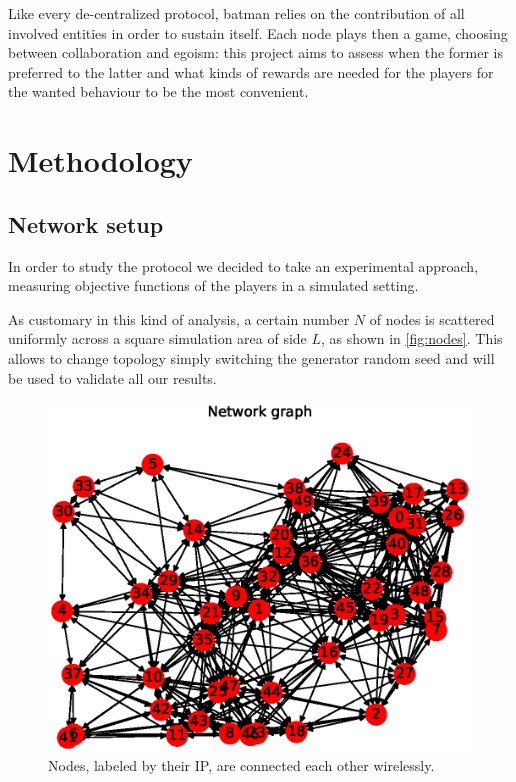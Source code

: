 \documentclass[conference]{IEEEtran}
\begin{document}
Like every de-centralized protocol, \gls{batman} relies on the contribution of all involved entities in order to sustain itself. Each node plays then a game, choosing between collaboration and egoism: this project aims to assess when the former is preferred to the latter and what kinds of rewards are needed for the players for the wanted behaviour to be the most convenient.

\section{Methodology}

\subsection{Network setup}

In order to study the protocol we decided to take an experimental approach, measuring objective functions of the players in a simulated setting.

As customary in this kind of analysis, a certain number $N$ of nodes is scattered uniformly across a square simulation area of side $L$, as shown in \autoref{fig:nodes}. This allows to change topology simply switching the generator random seed and will be used to validate all our results.

\begin{figure}[h]
  \centering
  \includegraphics[width=\linewidth]{figures/example_graph}
  \caption{Nodes, labeled by their IP, are connected each other wirelessly.}
  \label{fig:nodes}
\end{figure}
\end{document}
